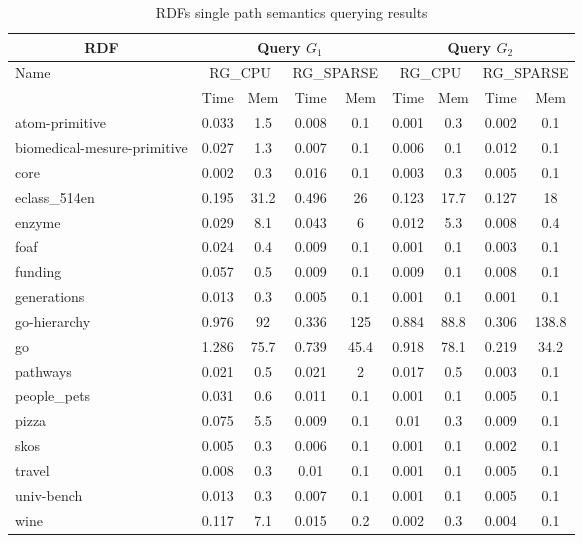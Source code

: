 {\setlength{\tabcolsep}{0.4em}
\begin{table*}[h]
\caption{RDFs single path semantics querying results}
\label{tbl:tableRDFSinglePathIndex}
\begin{tabular}{| l | c  c | c  c | c  c | c  c |}
    \hline
    \multicolumn{1}{|c|}{RDF}	&	\multicolumn{4}{|c|}{Query $G_1$}	&	\multicolumn{4}{|c|}{Query $G_2$} \\
    \hline
    \multirow{2}{*}{Name}	&	\multicolumn{2}{|c|}{RG\_CPU}	&	\multicolumn{2}{|c|}{RG\_SPARSE}	&	\multicolumn{2}{|c|}{RG\_CPU}	&	\multicolumn{2}{|c|}{RG\_SPARSE} \\
    		& Time & Mem &  Time     & Mem & Time     & Mem & Time     & Mem  \\    
    \hline
    \hline
    atom-primitive          & 0.033 & 1.5  & 0.008 & 0.1  & 0.001 & 0.3  & 0.002 & 0.1   \\
biomedical-mesure-primitive & 0.027 & 1.3  & 0.007 & 0.1  & 0.006 & 0.1  & 0.012 & 0.1   \\
core                        & 0.002 & 0.3  & 0.016 & 0.1  & 0.003 & 0.3  & 0.005 & 0.1   \\
eclass\_514en               & 0.195 & 31.2 & 0.496 & 26   & 0.123 & 17.7 & 0.127 & 18    \\
enzyme                      & 0.029 & 8.1  & 0.043 & 6    & 0.012 & 5.3  & 0.008 & 0.4   \\
foaf                        & 0.024 & 0.4  & 0.009 & 0.1  & 0.001 & 0.1  & 0.003 & 0.1   \\
funding                     & 0.057 & 0.5  & 0.009 & 0.1  & 0.009 & 0.1  & 0.008 & 0.1   \\
generations                 & 0.013 & 0.3  & 0.005 & 0.1  & 0.001 & 0.1  & 0.001 & 0.1   \\
go-hierarchy                & 0.976 & 92   & 0.336 & 125  & 0.884 & 88.8 & 0.306 & 138.8 \\
go                          & 1.286 & 75.7 & 0.739 & 45.4 & 0.918 & 78.1 & 0.219 & 34.2  \\
pathways                    & 0.021 & 0.5  & 0.021 & 2    & 0.017 & 0.5  & 0.003 & 0.1   \\
people\_pets                & 0.031 & 0.6  & 0.011 & 0.1  & 0.001 & 0.1  & 0.005 & 0.1   \\
pizza                       & 0.075 & 5.5  & 0.009 & 0.1  & 0.01  & 0.3  & 0.009 & 0.1   \\
skos                        & 0.005 & 0.3  & 0.006 & 0.1  & 0.001 & 0.1  & 0.002 & 0.1   \\
travel                      & 0.008 & 0.3  & 0.01  & 0.1  & 0.001 & 0.1  & 0.005 & 0.1   \\
univ-bench                  & 0.013 & 0.3  & 0.007 & 0.1  & 0.001 & 0.1  & 0.005 & 0.1   \\
wine                        & 0.117 & 7.1  & 0.015 & 0.2  & 0.002 & 0.3  & 0.004 & 0.1   \\
    \hline
  \end{tabular}
\end{table*}
}

